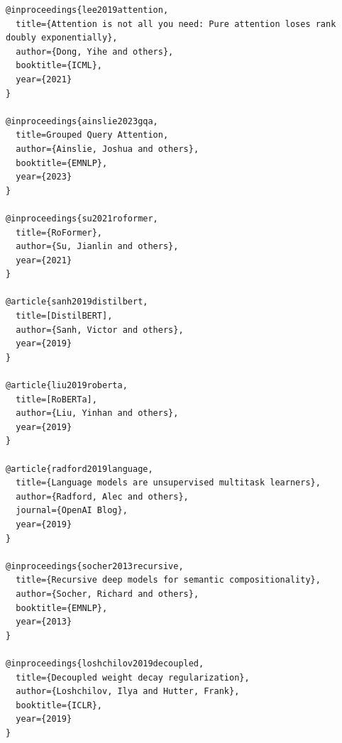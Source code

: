 \begin{lstlisting}
@inproceedings{lee2019attention,
  title={Attention is not all you need: Pure attention loses rank doubly exponentially},
  author={Dong, Yihe and others},
  booktitle={ICML},
  year={2021}
}

@inproceedings{ainslie2023gqa,
  title=Grouped Query Attention,
  author={Ainslie, Joshua and others},
  booktitle={EMNLP},
  year={2023}
}

@inproceedings{su2021roformer,
  title={RoFormer},
  author={Su, Jianlin and others},
  year={2021}
}

@article{sanh2019distilbert,
  title=[DistilBERT],
  author={Sanh, Victor and others},
  year={2019}
}

@article{liu2019roberta,
  title=[RoBERTa],
  author={Liu, Yinhan and others},
  year={2019}
}

@article{radford2019language,
  title={Language models are unsupervised multitask learners},
  author={Radford, Alec and others},
  journal={OpenAI Blog},
  year={2019}
}

@inproceedings{socher2013recursive,
  title={Recursive deep models for semantic compositionality},
  author={Socher, Richard and others},
  booktitle={EMNLP},
  year={2013}
}

@inproceedings{loshchilov2019decoupled,
  title={Decoupled weight decay regularization},
  author={Loshchilov, Ilya and Hutter, Frank},
  booktitle={ICLR},
  year={2019}
}
\end{lstlisting}

